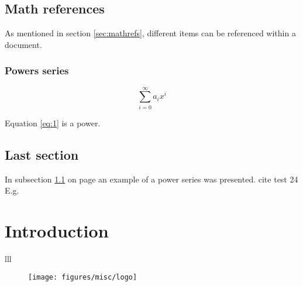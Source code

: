 \documentclass{article}
\begin{document}
\section{Math references} 
\label{mathrefs}
As mentioned in section \ref{sec:mathrefs}, different items can be referenced within a document.

\subsection{Powers series} 
		\label{sec:subsection}

		\begin{equation} 
	\label{eq:1}
\sum_{i=0}^{\infty} a_i x^i
\end{equation}

Equation \ref{eq:1} is a power.
\vspace{0.5cm}


\section{Last section}
In subsection \ref{sec:subsection} on page \pageref{eq:1} an example of a power series was presented.
cite test 24 E.g.


\chapter{Introduction} %


\begin{symbols}{lll} %
\end{symbols}

\begin{figure}[h!]
	\texttt{[image: figures/misc/logo]}
\end{figure}
\end{document}

